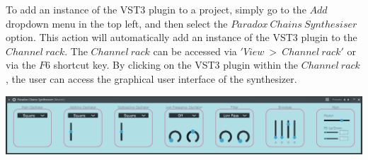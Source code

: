 \documentclass[a4paper,12pt]{report}
\begin{document}
To add an instance of the VST3 plugin to a project, simply go to the $Add$ dropdown menu in the top left, and then select the $Paradox\ Chains\ Synthesiser$ option. This action will automatically add an instance of the VST3 plugin to the $Channel\ rack$. The $Channel\ rack$ can be accessed via $'View\ >\ Channel\ rack'$ or via the $F6$ shortcut key. By clicking on the VST3 plugin within the $Channel\ rack$, the user can access the graphical user interface of the synthesizer.

\begin{center}
\includegraphics[width=36em]{SynthesiserMainGUI.png}
\end{center}
\end{document}
